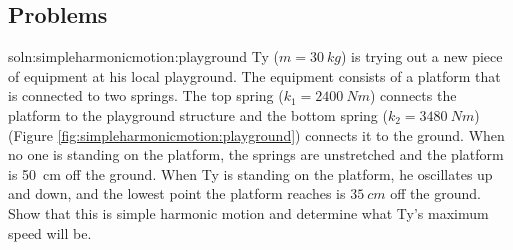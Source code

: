 \subsection{Problems}
\begin{problem}{soln:simpleharmonicmotion:playground}{\label{prob:simpleharmonicmotion:playground} Ty ($m=\SI{30}{kg}$) is trying out a new piece of equipment at his local playground. The equipment consists of a platform that is connected to two springs. The top spring ($k_1=\SI{2400}{Nm}$) connects the platform to the playground structure and the bottom spring ($k_2=\SI{3480}{Nm}$) (Figure \ref{fig:simpleharmonicmotion:playground}) connects it to the ground. When no one is standing on the platform, the springs are unstretched and the platform is \SI{50}{cm} off the ground. When Ty is standing on the platform, he oscillates up and down, and the lowest point the platform reaches is $\SI{35}{cm}$ off the ground. Show that this is simple harmonic motion and determine what Ty's maximum speed will be.}
\end{problem}

